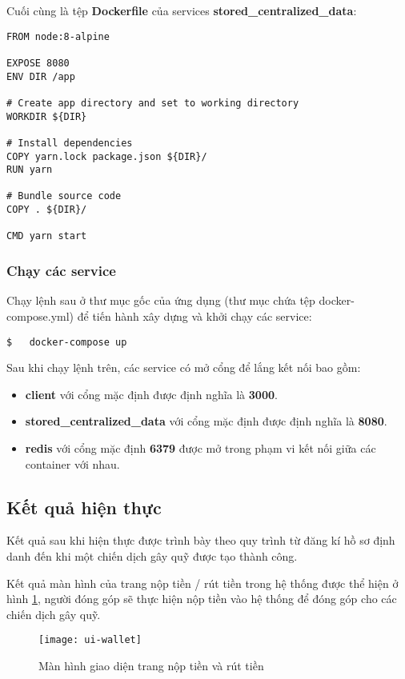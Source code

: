 \documentclass[../main-report.tex]{subfiles}
\begin{document}
Cuối cùng là tệp \textbf{Dockerfile} của services \textbf{stored\_centralized\_data}:

\begin{lstlisting}
FROM node:8-alpine

EXPOSE 8080
ENV DIR /app

# Create app directory and set to working directory
WORKDIR ${DIR}

# Install dependencies
COPY yarn.lock package.json ${DIR}/
RUN yarn

# Bundle source code
COPY . ${DIR}/

CMD yarn start
\end{lstlisting}
\subsubsection{Chạy các service}
\label{sec:run-service}
Chạy lệnh sau ở thư mục gốc của ứng dụng (thư mục chứa tệp docker-compose.yml) để tiến hành xây dựng và khởi chạy các service:

\begin{lstlisting}
$	docker-compose up
\end{lstlisting}

Sau khi chạy lệnh trên, các service có mở cổng để lắng kết nối bao gồm:

\begin{itemize}
\item \textbf{client} với cổng mặc định được định nghĩa là \textbf{3000}.
\item \textbf{stored\_centralized\_data} với cổng mặc định được định nghĩa là \textbf{8080}.
\item \textbf{redis} với cổng mặc định \textbf{6379} được mở trong phạm vi kết nối giữa các container với nhau.
\end{itemize}

\subsection{Kết quả hiện thực}
Kết quả sau khi hiện thực được trình bày theo quy trình từ đăng kí hồ sơ định danh đến khi một chiến dịch gây quỹ được tạo thành công.

Kết quả màn hình của trang nộp tiền / rút tiền trong hệ thống được thể hiện ở hình \ref{fig:ui-wallet}, người đóng góp sẽ thực hiện nộp tiền vào hệ thống để đóng góp cho các chiến dịch gây quỹ.

\begin{figure}[ht!]
\begin{center}
\label{fig:ui-wallet}
\texttt{[image: ui-wallet]}
\caption{Màn hình giao diện trang nộp tiền và rút tiền}
\end{center}
\end{figure}
\end{document}
